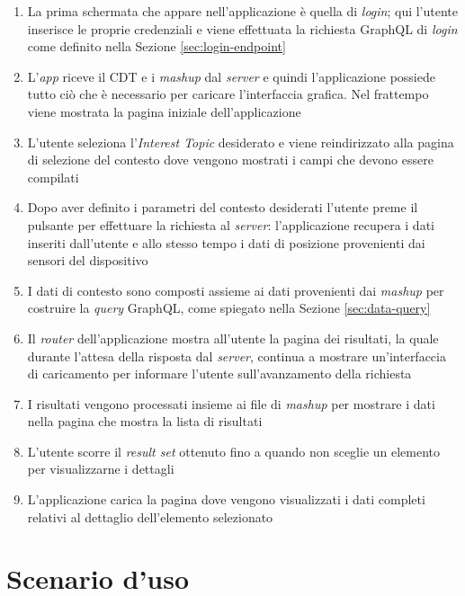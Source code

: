 \begin{enumerate}
	\item
	La prima schermata che appare nell'applicazione è quella di \emph{login}; qui l'utente inserisce le proprie credenziali e viene effettuata la richiesta GraphQL di \emph{login} come definito nella Sezione \ref{sec:login-endpoint}
	\item
	L'\emph{app} riceve il CDT e i \emph{mashup} dal \emph{server} e quindi l'applicazione possiede tutto ciò che è necessario per caricare l'interfaccia grafica. Nel frattempo viene mostrata la pagina iniziale dell'applicazione
	\item
	L'utente seleziona l'\emph{Interest Topic} desiderato e viene reindirizzato alla pagina di selezione del contesto dove vengono mostrati i campi che devono essere compilati
	\item
	Dopo aver definito i parametri del contesto desiderati l'utente preme il pulsante per effettuare la richiesta al \emph{server}: l'applicazione recupera i dati inseriti dall'utente e allo stesso tempo i dati di posizione provenienti dai sensori del dispositivo
	\item
	I dati di contesto sono composti assieme ai dati provenienti dai \emph{mashup} per costruire la \emph{query} GraphQL, come spiegato nella Sezione \ref{sec:data-query}
	\item
	Il \emph{router} dell'applicazione mostra all'utente la pagina dei risultati, la quale durante l'attesa della risposta dal \emph{server}, continua a mostrare un'interfaccia di caricamento per informare l'utente sull'avanzamento della richiesta
	\item
	I risultati vengono processati insieme ai file di \emph{mashup} per mostrare i dati nella pagina che mostra la lista di risultati
	\item
	L'utente scorre il \emph{result set} ottenuto fino a quando non sceglie un elemento per visualizzarne i dettagli
	\item
	L'applicazione carica la pagina dove vengono visualizzati i dati completi relativi al dettaglio dell'e\-le\-men\-to selezionato 
\end{enumerate}

\section{Scenario d'uso}

